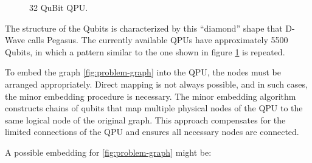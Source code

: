\begin{figure}[H]
\begin{center}
      \caption{32 QuBit QPU.}
      \label{fig:QPU}
  \end{center}
\end{figure}

The structure of the Qubits is characterized by this ``diamond'' shape that D-Wave calls Pegasus. The currently available QPUs have approximately 5500 Qubits, in which a pattern similar to the one shown in figure \ref{fig:QPU} is repeated.

To embed the graph \ref{fig:problem-graph} into the QPU, the nodes must be arranged appropriately. Direct mapping is not always possible, and in such cases, the minor embedding procedure\cite{ME} is necessary. The minor embedding algorithm\cite{MEdwave} constructs chains of qubits that map multiple physical nodes of the QPU to the same logical node of the original graph. This approach compensates for the limited connections of the QPU and ensures all necessary nodes are connected.

A possible embedding for \ref{fig:problem-graph} might be:

